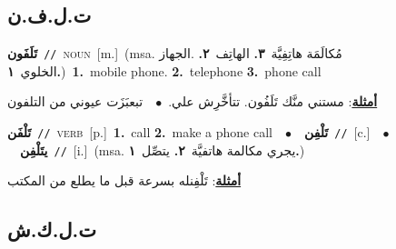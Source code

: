 \documentclass[10pt,a4paper,twoside]{article} %
\begin{document}
\begin{multicols}{2}
\vspace{-3mm}
\subsection*{\color{blue}\foreignlanguage{arabic}{ت.ل.ف.ن}\color{blue}{ (ntws)}} 

{\setlength\topsep{0pt}\textbf{\foreignlanguage{arabic}{تَلَفَون}}\ {\color{gray}\texttt{//}\color{black}}\ \textsc{noun}\ [m.]\ \color{gray}(msa. \foreignlanguage{arabic}{مُكالَمَة هاتِفِيَّة}~\foreignlanguage{arabic}{\textbf{٣.}}  \foreignlanguage{arabic}{الهاتِف}~\foreignlanguage{arabic}{\textbf{٢.}}  .\foreignlanguage{arabic}{الجهاز الخلوي}~\foreignlanguage{arabic}{\textbf{١.}})\color{black}\ \textbf{1.}~mobile phone.  \textbf{2.}~telephone  \textbf{3.}~phone call\  \begin{flushright}\color{gray}\foreignlanguage{arabic}{\textbf{\underline{\foreignlanguage{arabic}{أمثلة}}}: مستني منَّك تَلَفُون. تتأخَّرِش علي.\ $\bullet$\ \  تبعبَزَت عيوني من التلفون}\end{flushright}\color{black}} \vspace{2mm}

{\setlength\topsep{0pt}\textbf{\foreignlanguage{arabic}{تَلْفَن}}\ {\color{gray}\texttt{//}\color{black}}\ \textsc{verb}\ [p.]\ \textbf{1.}~call  \textbf{2.}~make a phone call\ \ $\bullet$\ \ \setlength\topsep{0pt}\textbf{\foreignlanguage{arabic}{تَلْفِن}}\ {\color{gray}\texttt{//}\color{black}}\ [c.]\ \ $\bullet$\ \ \setlength\topsep{0pt}\textbf{\foreignlanguage{arabic}{يتَلْفِن}}\ {\color{gray}\texttt{//}\color{black}}\ [i.]\ \color{gray}(msa. \foreignlanguage{arabic}{يجري مكالمة هاتفيَّة}~\foreignlanguage{arabic}{\textbf{٢.}}  \foreignlanguage{arabic}{يتصِّل}~\foreignlanguage{arabic}{\textbf{١.}})\color{black}\  \begin{flushright}\color{gray}\foreignlanguage{arabic}{\textbf{\underline{\foreignlanguage{arabic}{أمثلة}}}: تَلْفِنله بسرعة قبل ما يطلع من المكتب}\end{flushright}\color{black}} \vspace{2mm}

\vspace{-3mm}
\subsection*{\color{blue}\foreignlanguage{arabic}{ت.ل.ك.ش}\color{blue}{}} 


\end{multicols}
\end{document}
